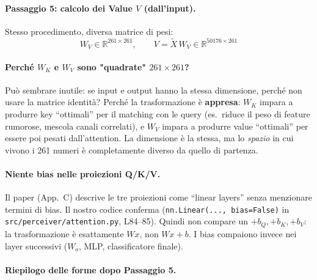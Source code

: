 \documentclass[
  11pt,
]{article}
\begin{document}
\paragraph{Passaggio 5: calcolo dei Value $V$ (dall'input).} Stesso procedimento, diversa matrice di pesi:
\[
W_V \in \mathbb{R}^{261 \times 261}, \qquad V = \tilde{X}\, W_V \in \mathbb{R}^{50176 \times 261}
\]

\paragraph{Perché $W_K$ e $W_V$ sono "quadrate" $261 \times 261$?} Può sembrare inutile: se input e output hanno la stessa dimensione, perché non usare la matrice identità? Perché la trasformazione è \textbf{appresa}: $W_K$ impara a produrre key ``ottimali'' per il matching con le query (es.\ riduce il peso di feature rumorose, mescola canali correlati), e $W_V$ impara a produrre value ``ottimali'' per essere poi pesati dall'attention. La dimensione è la stessa, ma lo \emph{spazio} in cui vivono i 261 numeri è completamente diverso da quello di partenza.

\paragraph{Niente bias nelle proiezioni Q/K/V.} Il paper (App.\ C) descrive le tre proiezioni come ``linear layers'' senza menzionare termini di bias. Il nostro codice conferma (\texttt{nn.Linear(..., bias=False)} in \texttt{src/perceiver/attention.py}, L84--85). Quindi non compare un $+b_Q, +b_K, +b_V$: la trasformazione è esattamente $W x$, non $W x + b$. I bias compaiono invece nei layer successivi ($W_o$, MLP, classificatore finale).

\paragraph{Riepilogo delle forme dopo Passaggio 5.}
\end{document}
